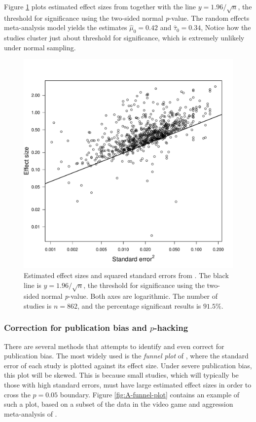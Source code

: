 Figure \ref{fig:motyl} plots estimated effect sizes from \cite{Motyl2017-dx} together with the line $y=1.96/\sqrt{n}$, the threshold for significance using the two-sided normal \emph{p}-value. The random effects meta-analysis model yields the estimates $\hat{\mu}_{0}=0.42$ and $\hat{\tau}_{0}=0.34$, Notice how the studies cluster just about threshold for significance, which is extremely unlikely
under normal sampling.
\begin{figure}
\noindent \begin{centering}
\includegraphics[scale=0.5]{chunks/motyl}
\par\end{centering}
\caption{\label{fig:motyl}Estimated effect sizes and squared standard errors from \cite{Motyl2017-dx}. The black line is $y=1.96/\sqrt{n}$, the threshold for significance using the two-sided normal \emph{p}-value. Both axes are logarithmic. The number of studies is $n=862$, and the percentage significant results is $91.5\%$.}
\end{figure}
\subsubsection{Correction for publication bias and $p$-hacking}

There are several methods that attempts to identify and even correct for publication bias. The most widely used is the \emph{funnel plot} of \cite{Egger1998-kj}, where the standard error of each study is plotted against its effect size. Under severe publication bias, this plot will be skewed. This is because small studies, which will
typically be those with high standard errors, must have large estimated
effect sizes in order to cross the $p=0.05$ boundary. Figure \ref{fig:A-funnel-plot} contains an example of such a plot, based on a subset of the data in the video game and aggression meta-analysis of \cite{Anderson2010-ki}.

